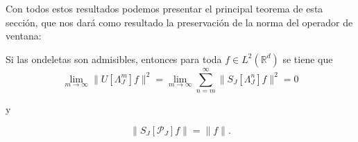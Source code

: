 \noindent Con todos estos resultados podemos presentar el principal teorema de esta sección, que nos dará como resultado la preservación de la norma del operador de ventana:


\begin{teorema} \label{teoremaOndeletasAdmisibles}
\noindent Si las ondeletas son admisibles, entonces para toda $f\in L^2(\mathbb{R}^d)$ se tiene que
\begin{equation}  
  \lim_{m\rightarrow\infty} \|U[\Lambda_J^m]f \|^2=\lim_{m\rightarrow\infty} \sum_{n=m}^{\infty} \|S_J[\Lambda_J^n]f\|^2=0
\end{equation}

y

\begin{equation}
  \|S_J[\mathcal{P}_J]f\|=\|f\|.
\end{equation}

\end{teorema}

